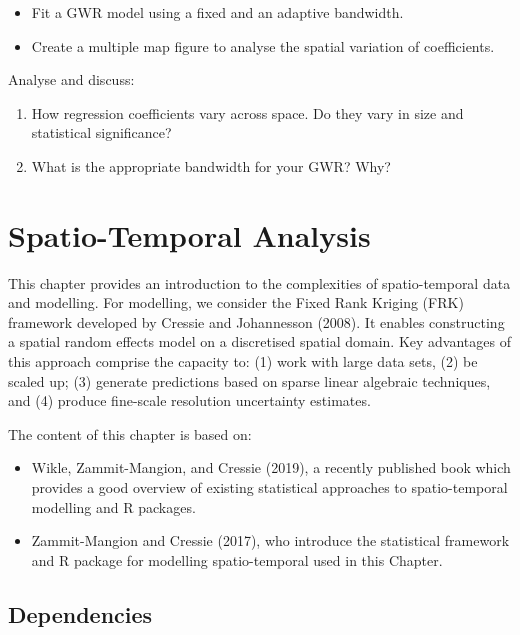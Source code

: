 \documentclass[
  letterpaper,
  DIV=11,
  numbers=noendperiod,
  oneside]{scrreprt}
\providecommand{\tightlist}{%
  \setlength{\itemsep}{0pt}\setlength{\parskip}{0pt}}\usepackage{longtable,booktabs,array}
\begin{document}
\begin{itemize}
\item
  Fit a GWR model using a fixed and an adaptive bandwidth.
\item
  Create a multiple map figure to analyse the spatial variation of
  coefficients.
\end{itemize}

Analyse and discuss:

\begin{enumerate}
\def\labelenumi{\arabic{enumi}.}
\tightlist
\item
  How regression coefficients vary across space. Do they vary in size
  and statistical significance?
\item
  What is the appropriate bandwidth for your GWR? Why?
\end{enumerate}


\chapter{Spatio-Temporal Analysis}\label{sec-chp10}

This chapter provides an introduction to the complexities of
spatio-temporal data and modelling. For modelling, we consider the Fixed
Rank Kriging (FRK) framework developed by Cressie and Johannesson
(2008). It enables constructing a spatial random effects model on a
discretised spatial domain. Key advantages of this approach comprise the
capacity to: (1) work with large data sets, (2) be scaled up; (3)
generate predictions based on sparse linear algebraic techniques, and
(4) produce fine-scale resolution uncertainty estimates.

The content of this chapter is based on:

\begin{itemize}
\item
  Wikle, Zammit-Mangion, and Cressie (2019), a recently published book
  which provides a good overview of existing statistical approaches to
  spatio-temporal modelling and R packages.
\item
  Zammit-Mangion and Cressie (2017), who introduce the statistical
  framework and R package for modelling spatio-temporal used in this
  Chapter.
\end{itemize}

\section{Dependencies}\label{dependencies-7}
\end{document}
